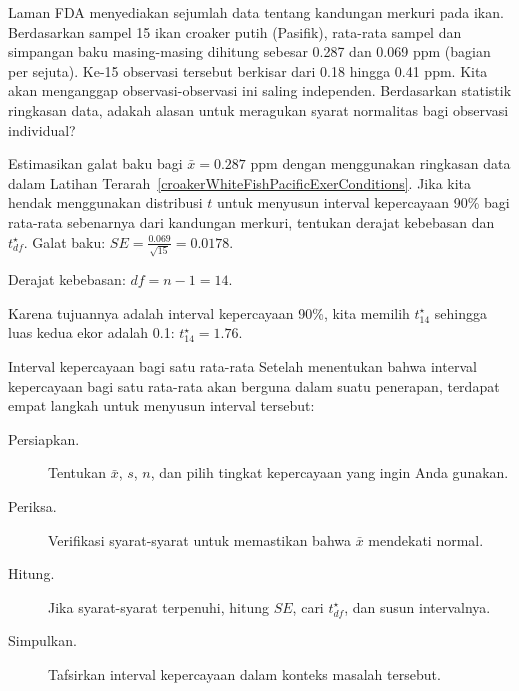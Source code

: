 
\begin{exercisewrap}
\begin{nexercise} \label{croakerWhiteFishPacificExerConditions}
Laman FDA menyediakan sejumlah data tentang kandungan merkuri pada ikan.
Berdasarkan sampel 15 ikan croaker putih (Pasifik),
rata-rata sampel dan simpangan baku masing-masing dihitung sebesar 0.287
dan 0.069 ppm (bagian per sejuta).
Ke-15 observasi tersebut berkisar dari 0.18 hingga 0.41 ppm.
Kita akan menganggap observasi-observasi ini saling independen.
Berdasarkan statistik ringkasan data,
adakah alasan untuk meragukan syarat normalitas
bagi observasi individual?\footnotemark{}
\end{nexercise}
\end{exercisewrap}

\begin{examplewrap}
\begin{nexample}{Estimasikan galat baku bagi
    $\bar{x} = 0.287$ ppm dengan menggunakan ringkasan data dalam
    Latihan Terarah~\ref{croakerWhiteFishPacificExerConditions}.
    Jika kita hendak menggunakan distribusi $t$ untuk menyusun
    interval kepercayaan 90\% bagi rata-rata sebenarnya dari
    kandungan merkuri, tentukan derajat kebebasan
    dan $t^{\star}_{df}$.}
  \label{croakerWhiteFishPacificExerSEDFTStar}%
  Galat baku: $SE = \frac{0.069}{\sqrt{15}} = 0.0178$.

  Derajat kebebasan: $df = n - 1 = 14$.

  Karena tujuannya adalah interval kepercayaan 90\%,
  kita memilih $t_{14}^{\star}$ sehingga luas kedua ekor
  adalah 0.1:
  $t^{\star}_{14} = 1.76$.
\end{nexample}
\end{examplewrap}

\begin{onebox}{Interval kepercayaan bagi satu rata-rata}
  Setelah menentukan bahwa interval kepercayaan bagi satu rata-rata
  akan berguna dalam suatu penerapan,
  terdapat empat langkah untuk menyusun interval tersebut:
  \begin{description}
  \item[Persiapkan.]
      Tentukan $\bar{x}$, $s$, $n$, dan pilih
      tingkat kepercayaan yang ingin Anda gunakan.
  \item[Periksa.]
      Verifikasi syarat-syarat untuk memastikan bahwa $\bar{x}$
      mendekati normal.
  \item[Hitung.]
      Jika syarat-syarat terpenuhi, hitung $SE$,
      cari $t_{df}^{\star}$, dan susun intervalnya.
  \item[Simpulkan.]
      Tafsirkan interval kepercayaan dalam konteks
      masalah tersebut.
  \end{description}
\end{onebox}

